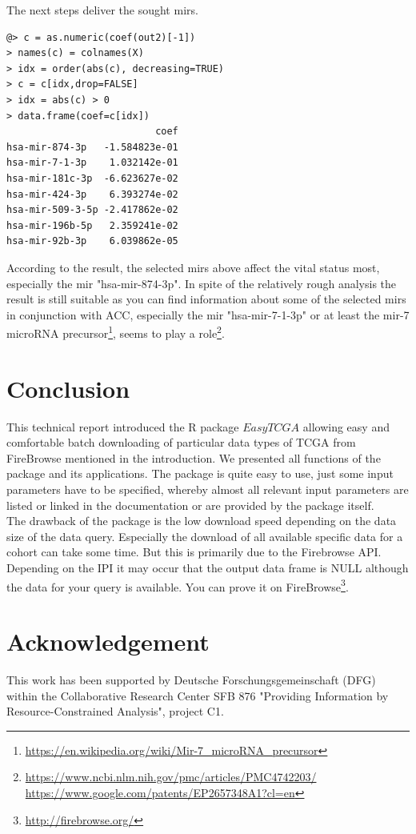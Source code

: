 \documentclass{TechReport}
\begin{document}
The next steps deliver the sought mirs.
\begin{lstlisting}[style=base]
@> c = as.numeric(coef(out2)[-1])
> names(c) = colnames(X)
> idx = order(abs(c), decreasing=TRUE)
> c = c[idx,drop=FALSE]
> idx = abs(c) > 0
> data.frame(coef=c[idx])
                          coef
hsa-mir-874-3p   -1.584823e-01
hsa-mir-7-1-3p    1.032142e-01
hsa-mir-181c-3p  -6.623627e-02
hsa-mir-424-3p    6.393274e-02
hsa-mir-509-3-5p -2.417862e-02
hsa-mir-196b-5p   2.359241e-02
hsa-mir-92b-3p    6.039862e-05
\end{lstlisting}
According to the result, the selected mirs above affect the vital status most,
especially the mir "hsa-mir-874-3p". In spite of the relatively rough analysis
the result is still suitable as you can find information about some of the selected mirs
 in conjunction with ACC, especially the mir "hsa-mir-7-1-3p" or at least the mir-7
 microRNA precursor\footnote{\url{https://en.wikipedia.org/wiki/Mir-7_microRNA_precursor}}, 
seems to play a  role\footnote{\url{https://www.ncbi.nlm.nih.gov/pmc/articles/PMC4742203/}\\
 \url{https://www.google.com/patents/EP2657348A1?cl=en}}.


\section{Conclusion}
This technical report introduced the R package $EasyTCGA$  allowing easy and comfortable
 batch downloading of particular data types of TCGA from FireBrowse mentioned in the introduction. 
We presented all functions of the package and its applications. The package is quite easy to use, 
just some input parameters have to be specified, whereby almost all relevant input parameters are
listed or linked in the documentation or are provided by the package itself. \\
The drawback of the package is the low download speed depending on the data size of the data
query. Especially the download of all available specific data for a cohort can take some time. But 
this is primarily due to the Firebrowse API. Depending on the IPI it may occur that the output data frame is NULL
although the data for your query is available. You can prove it on FireBrowse\footnote{\url{http://firebrowse.org/}}.\\





\newpage
\section*{Acknowledgement}

This work has been supported by Deutsche Forschungsgemeinschaft
   (DFG) within the Collaborative Research Center SFB 876 "Providing
   Information by Resource-Constrained Analysis", project C1.
\end{document}
